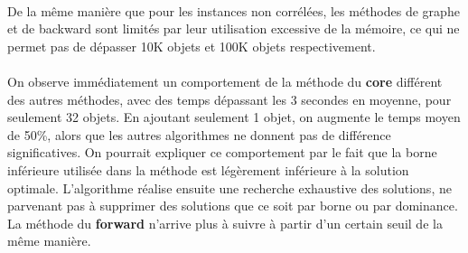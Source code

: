 \documentclass[12pt]{article}
\begin{document}
\begin{figure}[!h]
\begin{floatrow}
\end{floatrow}
\end{figure}

\paragraph{}De la même manière que pour les instances non corrélées, les méthodes de graphe et de backward sont limités par leur utilisation excessive de la mémoire, ce qui ne permet pas de dépasser 10K objets et 100K objets respectivement.

\paragraph{}On observe immédiatement un comportement de la méthode du \textbf{core} différent des autres méthodes, avec des temps dépassant les 3 secondes en moyenne, pour seulement 32 objets. En ajoutant seulement 1 objet, on augmente le temps moyen de 50\%, alors que les autres algorithmes ne donnent pas de différence significatives. On pourrait expliquer ce comportement par le fait que la borne inférieure utilisée dans la méthode est légèrement inférieure à la solution optimale. L'algorithme réalise ensuite une recherche exhaustive des solutions, ne parvenant pas à supprimer des solutions que ce soit par borne ou par dominance. La méthode du \textbf{forward} n'arrive plus à suivre à partir d'un certain seuil de la même manière.
\end{document}
